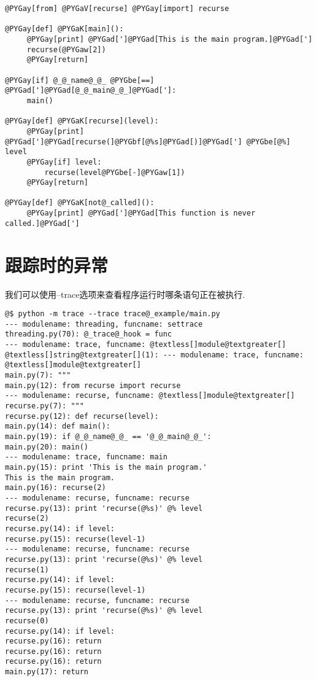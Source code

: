 \documentclass[a4paper,10pt,english]{manual}
\begin{document}
\begin{Verbatim}[commandchars=@\[\]]
@PYGay[from] @PYGaV[recurse] @PYGay[import] recurse

@PYGay[def] @PYGaK[main]():
     @PYGay[print] @PYGad[']@PYGad[This is the main program.]@PYGad[']
     recurse(@PYGaw[2])
     @PYGay[return]

@PYGay[if] @_@_name@_@_ @PYGbe[==] @PYGad[']@PYGad[@_@_main@_@_]@PYGad[']:
     main()

@PYGay[def] @PYGaK[recurse](level):
     @PYGay[print] @PYGad[']@PYGad[recurse(]@PYGbf[@%s]@PYGad[)]@PYGad['] @PYGbe[@%] level
     @PYGay[if] level:
         recurse(level@PYGbe[-]@PYGaw[1])
     @PYGay[return]

@PYGay[def] @PYGaK[not@_called]():
     @PYGay[print] @PYGad[']@PYGad[This function is never called.]@PYGad[']
\end{Verbatim}


\section{跟踪时的异常}

我们可以使用--trace选项来查看程序运行时哪条语句正在被执行.

\begin{Verbatim}[commandchars=@\[\]]
@$ python -m trace --trace trace@_example/main.py
--- modulename: threading, funcname: settrace
threading.py(70): @_trace@_hook = func
--- modulename: trace, funcname: @textless[]module@textgreater[]
@textless[]string@textgreater[](1): --- modulename: trace, funcname: @textless[]module@textgreater[]
main.py(7): """
main.py(12): from recurse import recurse
--- modulename: recurse, funcname: @textless[]module@textgreater[]
recurse.py(7): """
recurse.py(12): def recurse(level):
main.py(14): def main():
main.py(19): if @_@_name@_@_ == '@_@_main@_@_':
main.py(20): main()
--- modulename: trace, funcname: main
main.py(15): print 'This is the main program.'
This is the main program.
main.py(16): recurse(2)
--- modulename: recurse, funcname: recurse
recurse.py(13): print 'recurse(@%s)' @% level
recurse(2)
recurse.py(14): if level:
recurse.py(15): recurse(level-1)
--- modulename: recurse, funcname: recurse
recurse.py(13): print 'recurse(@%s)' @% level
recurse(1)
recurse.py(14): if level:
recurse.py(15): recurse(level-1)
--- modulename: recurse, funcname: recurse
recurse.py(13): print 'recurse(@%s)' @% level
recurse(0)
recurse.py(14): if level:
recurse.py(16): return
recurse.py(16): return
recurse.py(16): return
main.py(17): return
\end{Verbatim}
\end{document}

